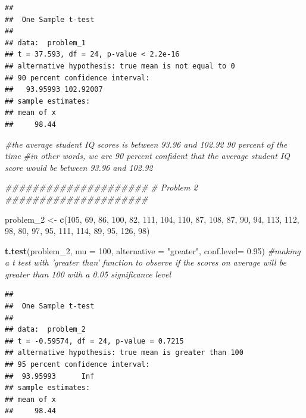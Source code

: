 \documentclass[]{article}
\newenvironment{Shaded}{\begin{snugshade}}{\end{snugshade}}
\newcommand{\CommentTok}[1]{\textcolor[rgb]{0.56,0.35,0.01}{\textit{#1}}}
\newcommand{\DataTypeTok}[1]{\textcolor[rgb]{0.13,0.29,0.53}{#1}}
\newcommand{\DecValTok}[1]{\textcolor[rgb]{0.00,0.00,0.81}{#1}}
\newcommand{\FloatTok}[1]{\textcolor[rgb]{0.00,0.00,0.81}{#1}}
\newcommand{\KeywordTok}[1]{\textcolor[rgb]{0.13,0.29,0.53}{\textbf{#1}}}
\newcommand{\NormalTok}[1]{#1}
\newcommand{\StringTok}[1]{\textcolor[rgb]{0.31,0.60,0.02}{#1}}
\begin{document}
\begin{verbatim}
## 
##  One Sample t-test
## 
## data:  problem_1
## t = 37.593, df = 24, p-value < 2.2e-16
## alternative hypothesis: true mean is not equal to 0
## 90 percent confidence interval:
##   93.95993 102.92007
## sample estimates:
## mean of x 
##     98.44
\end{verbatim}

\begin{Shaded}
\begin{Highlighting}[]
\CommentTok{#the average student IQ scores is between 93.96 and 102.92 90 percent of the time}
\CommentTok{#in other words, we are 90 percent confident that the average student IQ score would be between 93.96 and 102.92}

\CommentTok{#####################}
\CommentTok{# Problem 2}
\CommentTok{#####################}

\NormalTok{problem_}\DecValTok{2}\NormalTok{ <-}\StringTok{ }\KeywordTok{c}\NormalTok{(}\DecValTok{105}\NormalTok{, }\DecValTok{69}\NormalTok{, }\DecValTok{86}\NormalTok{, }\DecValTok{100}\NormalTok{, }\DecValTok{82}\NormalTok{, }\DecValTok{111}\NormalTok{, }\DecValTok{104}\NormalTok{, }\DecValTok{110}\NormalTok{, }\DecValTok{87}\NormalTok{, }\DecValTok{108}\NormalTok{, }\DecValTok{87}\NormalTok{, }\DecValTok{90}\NormalTok{, }\DecValTok{94}\NormalTok{, }\DecValTok{113}\NormalTok{, }\DecValTok{112}\NormalTok{, }\DecValTok{98}\NormalTok{, }\DecValTok{80}\NormalTok{, }\DecValTok{97}\NormalTok{, }\DecValTok{95}\NormalTok{, }\DecValTok{111}\NormalTok{, }\DecValTok{114}\NormalTok{, }\DecValTok{89}\NormalTok{, }\DecValTok{95}\NormalTok{, }\DecValTok{126}\NormalTok{, }\DecValTok{98}\NormalTok{)}

\KeywordTok{t.test}\NormalTok{(problem_}\DecValTok{2}\NormalTok{, }\DataTypeTok{mu =} \DecValTok{100}\NormalTok{, }\DataTypeTok{alternative =} \StringTok{"greater"}\NormalTok{, }\DataTypeTok{conf.level=} \FloatTok{0.95}\NormalTok{) }\CommentTok{#making a t test with 'greater than' function to observe if the scores on average will be greater than 100 with a 0.05 significance level}
\end{Highlighting}
\end{Shaded}

\begin{verbatim}
## 
##  One Sample t-test
## 
## data:  problem_2
## t = -0.59574, df = 24, p-value = 0.7215
## alternative hypothesis: true mean is greater than 100
## 95 percent confidence interval:
##  93.95993      Inf
## sample estimates:
## mean of x 
##     98.44
\end{verbatim}
\end{document}
